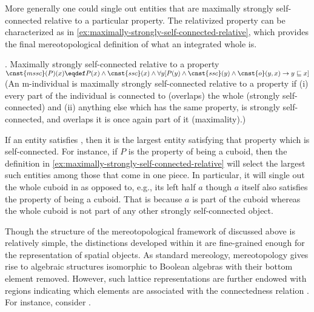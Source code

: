 	More generally one could single out entities that are maximally strongly self-connected relative to a particular property. The relativized  property can be characterized as in \ref{ex:maximally-strongly-self-connected-relative}, which provides the final mereotopological definition of what an integrated whole is.
	
	\ex. Maximally strongly self-connected relative to a property \citep[p. 60; adapted]{casati_varzi1999parts}\label{ex:maximally-strongly-self-connected-relative}\\
	$\cnst{mssc}(P)(x) \eqdef P(x) \wedge \cnst{ssc}(x) \wedge \forall y[P(y) \wedge \cnst{ssc}(y) \wedge \cnst{o}(y,x) \rightarrow y \sqsubseteq x]$\\
     (An m-individual is maximally strongly self-connected relative to a property if (i) every part of the individual is connected to (overlaps) the whole (strongly self-connected) and (ii) anything else which has the same property, is strongly self-connected, and overlaps it is once again part of it (maximality).)
	
	If an entity satisfies , then it is the largest entity satisfying that property which is self-connected. For instance, if $P$ is the property of being a cuboid, then the definition in \ref{ex:maximally-strongly-self-connected-relative} will select the largest such entities among those that come in one piece. In particular, it will single out the whole cuboid in  as opposed to, e.g., its left half $a$ though $a$ itself also satisfies the property of being a cuboid. That is because $a$ is part of the cuboid whereas the whole cuboid is not part of any other strongly self-connected object.
    
    Though the structure of the mereotopological framework of \citet{casati_varzi1999parts} discussed above is relatively simple, the distinctions developed within it are fine-grained enough for the representation of spatial objects. As standard mereology, mereotopology gives rise to algebraic structures isomorphic to \linebreak Boolean algebras with their bottom element removed. However, such lattice representations are further endowed with regions indicating which elements are associated with the connectedness relation . For instance, consider . 
     
